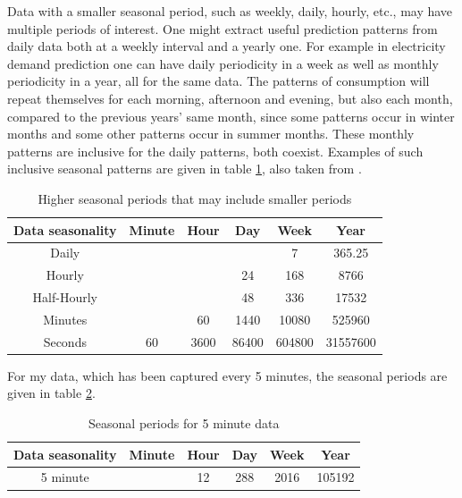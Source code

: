 \documentclass[12pt,a4paper,titlepage]{report}
\begin{document}
Data with a smaller seasonal period, such as weekly, daily, hourly, etc., may have multiple periods of interest. One might extract useful prediction patterns from daily data both at a weekly interval and a yearly one. For example in electricity demand prediction one can have daily periodicity in a week as well as monthly periodicity in a year, all for the same data. The patterns of consumption will repeat themselves for each morning, afternoon and evening, but also each month, compared to the previous years' same month, since some patterns occur in winter months and some other patterns occur in summer months. These monthly patterns are inclusive for the daily patterns, both coexist. Examples of such inclusive seasonal patterns are given in table \ref{multipleSeasonalPeriods}, also taken from \cite{hyndmanseasonalperiods}.

\begin{table}[h]
    \begin{tabular}{|c|c|c|c|c|c|}
        \hline 
        \textbf{Data seasonality} & \textbf{Minute} & \textbf{Hour} & \textbf{Day} & \textbf{Week} & \textbf{Year} \\ \hline 
        Daily & & & & 7 & 365.25 \\ \hline 
        Hourly & & & 24 & 168 & 8766 \\ \hline 
        Half-Hourly & & & 48 & 336 & 17532 \\ \hline 
        Minutes & & 60 & 1440 & 10080 & 525960 \\ \hline 
        Seconds & 60 & 3600 & 86400 & 604800 & 31557600 \\ \hline 
    \end{tabular} 
    \centering
    \caption{Higher seasonal periods that may include smaller periods}
    \label{multipleSeasonalPeriods}
\end{table}

For my data, which has been captured every 5 minutes, the seasonal periods are given in table \ref{5minSeasonalPeriods}.

\begin{table}[h]
    \begin{tabular}{|c|c|c|c|c|c|}
        \hline 
        \textbf{Data seasonality} & \textbf{Minute} & \textbf{Hour} & \textbf{Day} & \textbf{Week} & \textbf{Year} \\ \hline 
        5 minute & & 12 & 288 & 2016 & 105192 \\ \hline 
    \end{tabular} 
    \centering
    \caption{Seasonal periods for 5 minute data}
    \label{5minSeasonalPeriods}
\end{table}
\end{document}
